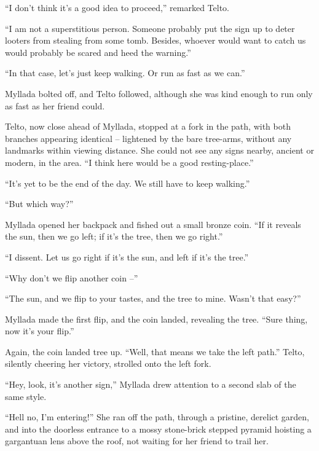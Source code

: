 ``I don't think it's a good idea to proceed,'' remarked Telto.

``I am not a superstitious person. Someone probably put the sign up to deter looters from stealing from some tomb. Besides, whoever would want to catch us would probably be scared and heed the warning.''

``In that case, let's just keep walking. Or run as fast as we can.''

Myllada bolted off, and Telto followed, although she was kind enough to run only as fast as her friend could.

\centeredstars

Telto, now close ahead of Myllada, stopped at a fork in the path, with both branches appearing identical -- lightened by the bare tree-arms, without any landmarks within viewing distance. She could not see any signs nearby, ancient or modern, in the area. ``I think here would be a good resting-place.''

``It's yet to be the end of the day. We still have to keep walking.''

``But which way?''

Myllada opened her backpack and fished out a small bronze coin. ``If it reveals the sun, then we go left; if it's the tree, then we go right.''

``I dissent. Let us go right if it's the sun, and left if it's the tree.''

``Why don't we flip another coin --''

``The sun, and we flip to your tastes, and the tree to mine. Wasn't that easy?''

Myllada made the first flip, and the coin landed, revealing the tree. ``Sure thing, now it's your flip.''

Again, the coin landed tree up. ``Well, that means we take the left path.'' Telto, silently cheering her victory, strolled onto the left fork.

\centeredstars

``Hey, look, it's another sign,'' Myllada drew attention to a second slab of the same style.


``Hell no, I'm entering!'' She ran off the path, through a pristine, derelict garden, and into the doorless entrance to a mossy stone-brick stepped pyramid hoisting a gargantuan lens above the roof, not waiting for her friend to trail her.


